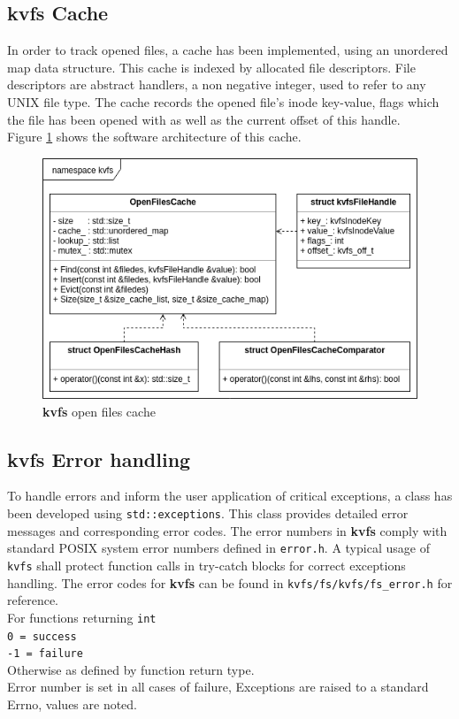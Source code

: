 \documentclass[bsc,frontabs,twoside,singlespacing,parskip,deptreport]{infthesis}     %
\begin{document}
{\subsection{kvfs Cache}
In order to track opened files, a cache has been implemented, using an unordered map data structure. This cache is indexed by allocated file descriptors. File descriptors are abstract handlers, a non negative integer, used to refer to any UNIX file type. The cache records the opened file's inode key-value, flags which the file has been opened with as well as the current offset of this handle.
\\
Figure \ref{fig:kvfs_openfiles_cache} shows the software architecture of this cache.
\begin{figure}[h!]
	\centering
	\includegraphics[scale=0.6]{diagrams/kvfs_open_files_cache.png}
	\caption{ {\bf kvfs} open files cache}
	 \label{fig:kvfs_openfiles_cache}
\end{figure}
\subsection{kvfs Error handling}
To handle errors and inform the user application of critical exceptions, a class has been developed 
using {\tt std::exceptions}. This class provides detailed error messages and corresponding error codes. The error numbers in {\bf kvfs} comply with standard POSIX system error numbers defined in {\tt error.h}. A typical usage of {\tt kvfs} shall protect function calls in try-catch blocks for correct exceptions handling. The error codes for {\bf kvfs} can be found 
in {\tt kvfs/fs/kvfs/fs\_error.h} for reference.
\\ For functions returning {\tt int}
\\{\tt 0  = success \\ -1 = failure} \\ Otherwise as defined by function return type.
\\ Error number is set in all cases of failure, Exceptions are raised to a standard Errno, values are noted.
}
\end{document}
